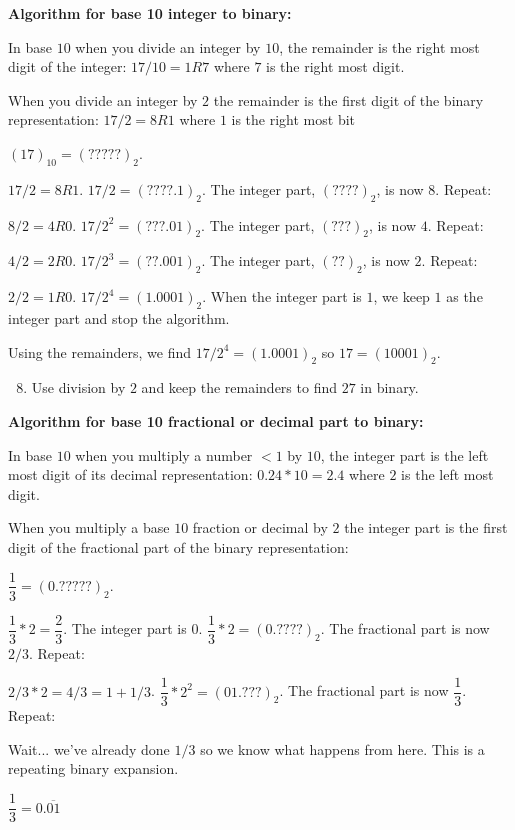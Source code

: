 \documentclass[12pt,letterpaper,noanswers]{exam}
\begin{document}
\begin{tcolorbox}
\textbf{Algorithm for base 10 integer to binary:}

In base $10$ when you divide an integer by $10$, the remainder is the right most digit of the integer: $17/10 = 1 R7$ where $7$ is the right most digit.

When you divide an integer by $2$ the remainder is the first digit of the binary representation:
$17/2 = 8 R1$ where $1$ is the right most bit

$(17)_{10} = (? ? ? ? ?)_2$.

$17/2 = 8 R1$.  $17/2 = (? ? ? ?.1)_2$. The integer part, $(? ? ? ?)_2$, is now $8$.  Repeat:



$8/2 = 4 R0$.  $17/2^2 = (? ? ?.01)_2$. The integer part, $(? ? ?)_2$, is now $4$.  Repeat:

$4/2 = 2 R0$.  $17/2^3 = (? ?.001)_2$. The integer part, $(? ?)_2$, is now $2$.  Repeat:

$2/2 = 1 R0$.  $17/2^4 = (1 .0001)_2$. When the integer part is $1$, we keep $1$ as the integer part and stop the algorithm.

Using the remainders, we find $17/2^4 = (1.0001)_2$ so $17 = (10001)_2$.

\end{tcolorbox}

\begin{enumerate}
\setcounter{enumi}{7}
    \item Use division by $2$ and keep the remainders to find $27$ in binary.
\end{enumerate}

\begin{tcolorbox}
\textbf{Algorithm for base 10 fractional or decimal part to binary:}

In base $10$ when you multiply a number $<1$ by $10$, the integer part is the left most digit of its decimal representation: $0.24*10 = 2.4$ where $2$ is the left most digit.

When you multiply a base $10$ fraction or decimal by $2$ the integer part is the first digit of the fractional part of the binary representation:

$\dfrac{1}{3} = (0. ? ? ? ? ?)_2$.

$\dfrac{1}{3}*2 = \dfrac{2}{3}$.  The integer part is $0$.  $\dfrac{1}{3}*2 = (0. ? ? ? ?)_2$. The fractional part is now $2/3$.  Repeat:

$2/3 * 2 = 4/3 = 1 + 1/3$.  $\dfrac{1}{3}*2^2 = (01. ? ? ?)_2$. The fractional part is now $\dfrac{1}{3}$.  Repeat:

Wait... we've already done $1/3$ so we know what happens from here.  This is a repeating binary expansion.  

$\dfrac{1}{3} = 0.\overline{01}$

\end{tcolorbox}
\end{document}
